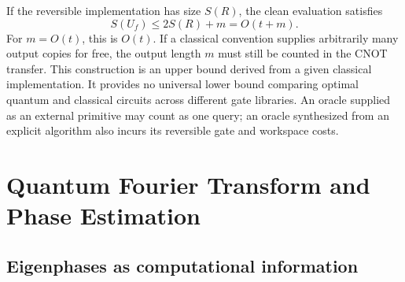\documentclass[11pt,oneside,openany]{book}
\theoremstyle{definition}
\begin{document}
If the reversible implementation has size $S(R)$, the clean evaluation satisfies
\begin{equation}
 S(U_f)\le2S(R)+m=O(t+m).
\end{equation}
For $m=O(t)$, this is $O(t)$. If a classical convention supplies arbitrarily many output copies for free, the output length $m$ must still be counted in the CNOT transfer. This construction is an upper bound derived from a given classical implementation. It provides no universal lower bound comparing optimal quantum and classical circuits across different gate libraries. An oracle supplied as an external primitive may count as one query; an oracle synthesized from an explicit algorithm also incurs its reversible gate and workspace costs.

\chapter{Quantum Fourier Transform and Phase Estimation}
\label{ch:phase}

\section{Eigenphases as computational information}
\end{document}
